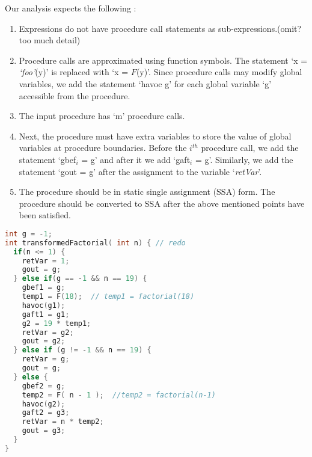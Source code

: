 \documentclass{llncs}
\newcommand{\foo}{\textit{`foo'}}
\newcommand{\retVar}{\textit{retVar}}
\newcommand{\F}{\mathit{F}}
\begin{document}
Our analysis expects the following :
\begin{enumerate}
\item Expressions do not have procedure call statements as
  sub-expressions.(omit? too much detail)
\item Procedure calls are approximated using function symbols. The
  statement `x = \foo(y)' is replaced with `x = $\F$(y)'. Since
  procedure calls may modify global variables, we add the statement
  `havoc g' for each global variable `g' accessible from the
  procedure.
\item The input procedure has `m' procedure calls.
\item Next, the procedure must have extra variables to store the value
  of global variables at procedure boundaries. Before the
  $\mathit{i^{th}}$ procedure call, we add the statement `gbef$_i$ =
  g' and after it we add `gaft$_i$ = g'. Similarly, we add the
  statement `gout = g' after the assignment to the variable `\retVar'.
\item The procedure should be in static single assignment (SSA)
  form. The procedure should be converted to SSA after the above
  mentioned points have been satisfied.
\end{enumerate}

\begin{lstlisting}[language=c, caption= {Procedure factorial from
      Listing~\ref{lst:factorialSimple} converted to the form our
      approach expects. We refer to this procedure as `transformed
      factorial'.}, label=lst:factorialTransformed]
int g = -1;
int transformedFactorial( int n) { // redo
  if(n <= 1) {
    retVar = 1;
    gout = g;
  } else if(g == -1 && n == 19) {
    gbef1 = g;
    temp1 = F(18);  // temp1 = factorial(18)
    havoc(g1);
    gaft1 = g1;
    g2 = 19 * temp1;
    retVar = g2;
    gout = g2;
  } else if (g != -1 && n == 19) {
    retVar = g;
    gout = g;
  } else {
    gbef2 = g;
    temp2 = F( n - 1 );  //temp2 = factorial(n-1)
    havoc(g2);
    gaft2 = g3;
    retVar = n * temp2;
    gout = g3;
  }
}
\end{lstlisting}

\end{document}
